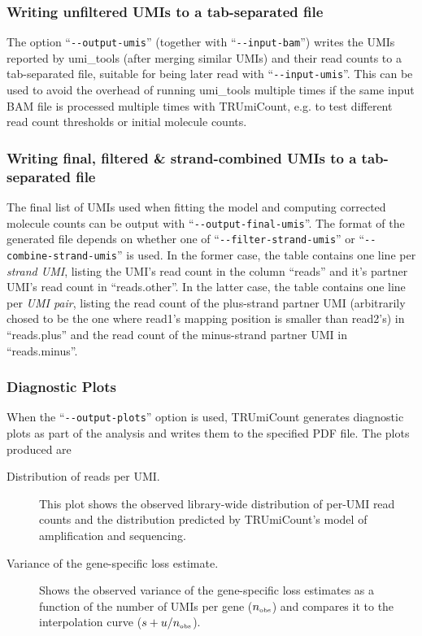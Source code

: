 \documentclass[10pt]{article}
\newcommand{\ddarg}[1]{\texttt{-{}-#1}}
\begin{document}
\subsubsection*{Writing unfiltered UMIs to a tab-separated file }

The option ``\ddarg{output-umis}'' (together with ``\ddarg{input-bam}'') writes the UMIs reported by umi\_tools (after merging similar UMIs) and their read counts to a tab-separated file, suitable for being later read with ``\ddarg{input-umis}''. This can be used to avoid the overhead of running umi\_tools multiple times if the same input BAM file is processed multiple times with TRUmiCount, e.g. to test different read count thresholds or initial molecule counts.

\subsubsection*{Writing final, filtered \& strand-combined UMIs to a tab-separated file }

The final list of UMIs used when fitting the model and computing corrected molecule counts can be output with ``\ddarg{output-final-umis}''. The format of the generated file depends on whether one of ``\ddarg{filter-strand-umis}'' or ``\ddarg{combine-strand-umis}'' is used. In the former case, the table contains one line per \emph{strand UMI}, listing the UMI's read count in the column ``reads'' and it's partner UMI's read count in ``reads.other''. In the latter case, the table contains one line per \emph{UMI pair}, listing the read count of the plus-strand partner UMI (arbitrarily chosed to be the one where read1's mapping position is smaller than read2's) in ``reads.plus'' and the read count of the minus-strand partner UMI in ``reads.minus''.

\subsubsection*{Diagnostic Plots}

When the ``\ddarg{output-plots}'' option is used, TRUmiCount generates diagnostic plots as part of the analysis and writes them to the specified PDF file. The plots produced are

\begin{description}
\item[Distribution of reads per UMI.] This plot shows the observed library-wide distribution of per-UMI read counts and the distribution predicted by TRUmiCount's model of amplification and sequencing.

\item[Variance of the gene-specific loss estimate.] Shows the observed variance of the gene-specific loss estimates as a function of the number of UMIs per gene ($n_{\textrm{\tiny obs}}$) and compares it to the interpolation curve ($s + u / n_{\textrm{\tiny obs}}$).
\end{description}
\end{document}
